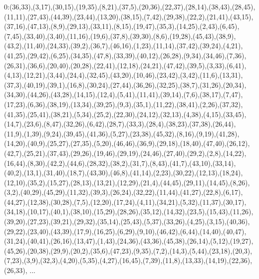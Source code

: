 0:(36,33),(3,17),(30,15),(19,35),(8,21),(37,5),(20,36),(22,37),(28,14),(38,43),(28,45),(11,11),(27,43),(44,39),(23,44),(13,20),(38,15),(7,42),(29,38),(22,2),(21,41),(43,15),(37,16),(47,13),(8,9),(29,13),(33,11),(8,15),(19,47),(35,3),(14,25),(2,43),(6,45),(7,45),(33,40),(3,40),(11,16),(19,6),(37,8),(39,30),(8,6),(19,28),(45,43),(38,9),(43,2),(11,40),(24,33),(39,2),(36,7),(46,16),(1,23),(11,14),(37,42),(39,24),(4,21),(41,25),(29,42),(6,25),(34,35),(47,8),(33,39),(40,12),(26,28),(9,34),(34,46),(7,36),(26,31),(36,6),(20,40),(20,28),(22,41),(12,18),(24,21),(47,42),(39,5),(3,33),(6,41),(4,13),(12,21),(3,44),(24,4),(32,45),(43,20),(10,46),(23,42),(3,42),(11,6),(13,31),(37,3),(40,19),(39,1),(16,8),(30,24),(27,44),(36,26),(32,25),(38,7),(31,26),(20,34),(34,30),(44,26),(43,28),(14,15),(12,4),(5,41),(11,41),(39,14),(7,6),(38,17),(7,47),(17,23),(6,36),(38,19),(13,34),(39,25),(9,3),(35,1),(11,22),(38,41),(2,26),(37,32),(41,35),(25,41),(38,21),(5,34),(25,2),(22,30),(24,12),(32,13),(4,38),(4,15),(33,45),(14,7),(23,6),(8,47),(32,26),(6,42),(28,7),(33,3),(28,4),(38,23),(37,38),(26,44),(11,9),(1,39),(9,24),(39,45),(41,36),(5,27),(23,38),(45,32),(8,16),(9,19),(41,28),(14,20),(40,9),(25,27),(27,35),(5,20),(46,46),(36,9),(29,18),(18,40),(47,40),(26,12),(42,7),(25,21),(37,43),(29,26),(19,46),(29,19),(24,46),(27,40),(29,2),(2,8),(14,22),(16,44),(8,30),(42,2),(44,6),(28,32),(38,2),(31,7),(8,43),(41,7),(43,10),(33,14),(40,2),(13,1),(31,40),(18,7),(43,30),(46,8),(41,14),(2,23),(30,22),(12,13),(18,24),(12,10),(35,2),(15,27),(28,13),(13,21),(12,29),(21,4),(44,45),(29,11),(14,45),(8,26),(3,2),(40,29),(45,29),(11,32),(39,3),(26,24),(32,22),(11,44),(41,27),(22,8),(6,17),(44,27),(12,38),(30,28),(7,5),(12,20),(17,24),(4,11),(34,21),(5,32),(11,37),(30,17),(34,18),(10,17),(40,1),(38,10),(15,29),(28,26),(35,12),(14,32),(23,5),(15,43),(11,26),(39,20),(27,23),(39,21),(29,32),(35,14),(25,43),(5,37),(33,26),(4,25),(3,15),(40,36),(29,22),(23,40),(43,39),(17,9),(16,25),(6,29),(9,10),(46,42),(6,44),(14,40),(40,47),(31,24),(40,41),(26,16),(13,47),(1,43),(24,36),(43,36),(45,38),(26,14),(5,12),(19,27),(45,26),(20,38),(29,9),(20,2),(35,6),(47,23),(9,35),(7,2),(14,3),(5,44),(23,18),(20,3),(7,23),(3,9),(32,3),(4,20),(5,35),(4,27),(16,45),(7,39),(11,8),(13,33),(14,19),(22,36),(26,33),
...
